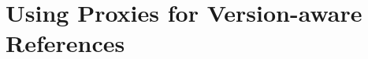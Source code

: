 % 

% 
% 
% 
% 
% 







\section{Using Proxies for Version-aware References} \label{sec:APPROACH:2}

